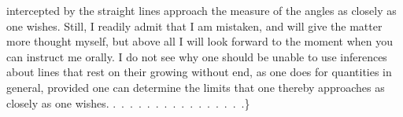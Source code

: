 %
intercepted by the straight lines approach the measure of the angles as closely as one wishes. Still, I readily admit that I am mistaken, and will give the matter more thought myself, but above all I will look forward to the moment when you can instruct me orally. I do not see why one should be unable to use inferences about lines that rest on their growing without end, as one does for quantities in general, provided one can determine the limits that one thereby approaches as closely as one wishes. \mbox{.\ .\ .\ .\ .\ .\ .\ .\ .\ .\ .\ .\ .\ .\ .\ .}\}
